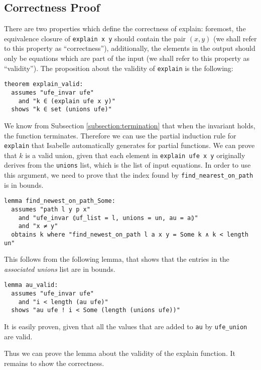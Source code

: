 \subsection{Correctness Proof}

There are two properties which define the correctness of explain: foremost, the equivalence closure of \lstinline{explain x y} should contain the pair $(x, y)$ (we shall refer to this property as ``correctness''), additionally, the elements in the output should only be equations which are part of the input (we shall refer to this property as ``validity''). The proposition about the validity of \lstinline{explain} is the following:

\begin{lstlisting}
theorem explain_valid:
  assumes "ufe_invar ufe"
    and "k ∈ (explain ufe x y)"
  shows "k ∈ set (unions ufe)"
\end{lstlisting}

We know from Subsection \ref{subsection:termination} that when the invariant holds, the function terminates. Therefore we can use the partial induction rule for \lstinline|explain| that Isabelle automatically generates for partial functions. We can prove that $k$ is a valid union, given that each element in \lstinline|explain ufe x y| originally derives from the \lstinline{unions} list, which is the list of input equations. In order to use this argument, we need to prove that the index found by \lstinline{find_nearest_on_path} is in bounds.

\begin{lstlisting}
lemma find_newest_on_path_Some:
  assumes "path l y p x"
    and "ufe_invar ⦇uf_list = l, unions = un, au = a⦈"
    and "x ≠ y"
  obtains k where "find_newest_on_path l a x y = Some k ∧ k < length un"
\end{lstlisting}

This follows from the following lemma, that shows that the entries in the \emph{associated unions} list are in bounds.

\begin{lstlisting}
lemma au_valid:
  assumes "ufe_invar ufe"
    and "i < length (au ufe)"
  shows "au ufe ! i < Some (length (unions ufe))"
\end{lstlisting}

It is easily proven, given that all the values that are added to \lstinline|au| by \lstinline|ufe_union| are valid.

Thus we can prove the lemma about the validity of the explain function.
It remains to show the correctness.

